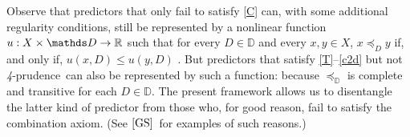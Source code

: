 \documentclass[12pt,a4paper,twoside]{article}
\newcommand{\gsii}{$\textup{[GS]}$}
\newcommand{\mbbd}{{\mathds D}}
\newcommand{\fourpru}{\textit{4}-\textup{prudence}}
\begin{document}
\begin{remark}
Observe that predictors that only fail to satisfy \ref{C} can, with some
additional regularity conditions, still be represented by a nonlinear function
$u: X \times \mbbd \rightarrow \R $ such that for every $D \in \mbbd$ and every
$x,y \in X $, $x \preceq_{D} y$ if, and only if, $ u(x,D)\leq u(y,D)$
\citep[see][]{OCallaghan-Parametric_continuity}. But predictors that satisfy
\ref{T}--\ref{c2d} but not \fourpru\ can also be represented by such a function:
because $\preceq_{\mbbd}$ is complete and transitive for each $D \in \mbbd$. The
present framework allows us to disentangle the latter kind of predictor from
those who, for good reason, fail to satisfy the combination axiom. (See \gsii\
for  examples of such reasons.)
\end{remark}

\end{document}
